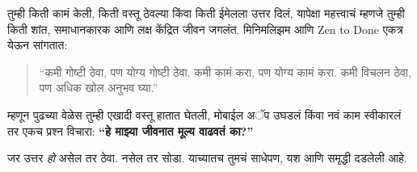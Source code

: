 तुम्ही किती कामं केली, किती वस्तू ठेवल्या किंवा किती ईमेलला उत्तर दिलं, यापेक्षा महत्त्वाचं म्हणजे तुम्ही किती शांत, समाधानकारक आणि लक्ष केंद्रित जीवन जगलंत. मिनिमलिझम आणि Zen to Done एकत्र येऊन सांगतात:  

\begin{quote}
“कमी गोष्टी ठेवा, पण योग्य गोष्टी ठेवा.  
कमी कामं करा, पण योग्य कामं करा.  
कमी विचलन ठेवा, पण अधिक खोल अनुभव घ्या.”  
\end{quote}

म्हणून पुढच्या वेळेस तुम्ही एखादी वस्तू हातात घेतली, मोबाईल अॅप उघडलं किंवा नवं काम स्वीकारलं तर एकच प्रश्न विचारा:  
\textbf{“हे माझ्या जीवनात मूल्य वाढवतं का?”}  

जर उत्तर \textit{हो} असेल तर ठेवा. नसेल तर सोडा.  
याच्यातच तुमचं साधेपण, यश आणि समृद्धी दडलेली आहे.  
